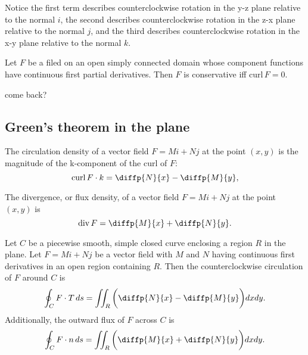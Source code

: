 \documentclass[oneside]{book}
\begin{document}
\begin{remark}
	Notice the first term describes counterclockwise rotation in the y-z plane relative to the normal \(i\), the second describes counterclockwise rotation in the z-x plane relative to the normal \(j\), and the third describes counterclockwise rotation in the x-y plane relative to the normal \(k\).
\end{remark}
\begin{theorem}
	Let \(F\) be a filed on an open simply connected domain whose component functions have continuous first partial derivatives. Then \(F\) is conservative iff \(\text{curl}\,F=0\).
\end{theorem}
\begin{definition}
	come back?
\end{definition}
\subsection{Green's theorem in the plane}
\begin{definition}
	The circulation density of a vector field \(F=Mi+Nj\) at the point \((x,y)\) is the magnitude of the k-component of the curl of \(F\):
	\begin{equation*}
		\text{curl}\,F\cdot k=\diffp{N}{x}-\diffp{M}{y},
	\end{equation*}
\end{definition}
\begin{definition}[Divergence]
	The divergence, or flux density, of a vector field \(F=Mi+Nj\) at the point \((x,y)\) is
	\begin{equation*}
		\text{div}\,F=\diffp{M}{x}+\diffp{N}{y}.
	\end{equation*}
\end{definition}
\begin{theorem}
	Let \(C\) be a piecewise smooth, simple closed curve enclosing a region \(R\) in the plane. Let \(F=Mi+Nj\) be a vector field with \(M\) and \(N\) having continuous first derivatives in an open region containing \(R\). Then the counterclockwise circulation of \(F\) around \(C\) is
\begin{equation*}
	\oint_{C}F\cdot T\,ds=\iint_R\bigg(\diffp{N}{x}-\diffp{M}{y}\bigg)dxdy.
\end{equation*}
	Additionally, the outward flux of \(F\) across \(C\) is
\begin{equation*}
	\oint_{C}F\cdot n\,ds=\iint_R\bigg(\diffp{M}{x}+\diffp{N}{y}\bigg)dxdy.
\end{equation*}
\end{theorem}
\end{document}

